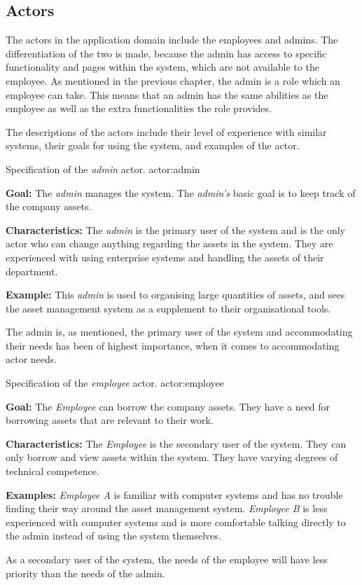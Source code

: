 \subsection{Actors} \label{scc:actors}
The actors in the application domain include the employees and admins. The differentiation of the two is made, because the admin has access to specific functionality and pages within the system, which are not available to the employee. As mentioned in the previous chapter, the admin is a role which an employee can take. This means that an admin has the same abilities as the employee as well as the extra functionalities the role provides.
\par
The descriptions of the actors include their level of experience with similar systems, their goals for using the system, and examples of the actor.

    {Specification of the \textit{admin} actor.}
    {actor:admin}
    {
        \textbf{Goal:} The \textit{admin} manages the system. The \textit{admin's} basic goal is to keep track of the company assets.
        \vskip 0.2cm
        
        \textbf{Characteristics:} The \textit{admin} is the primary user of the system and is the only actor who can change anything regarding the assets in the system. They are experienced with using enterprise systems and handling the assets of their department.
        \vskip 0.2cm
        
        \textbf{Example:} This \textit{admin} is used to organising large quantities of assets, and sees the asset management system as a supplement to their organisational tools.
    }

The admin is, as mentioned, the primary user of the system and accommodating their needs has been of highest importance, when it comes to accommodating actor needs.

    {Specification of the \textit{employee} actor.}
    {actor:employee}
    {
        \textbf{Goal:} The \textit{Employee} can borrow the company assets. They have a need for borrowing assets that are relevant to their work.
        \vskip 0.2cm
        
        \textbf{Characteristics:} The \textit{Employee} is the secondary user of the system. They can only borrow and view assets within the system. They have varying degrees of technical competence.
        \vskip 0.2cm
        
        \textbf{Examples:} \textit{Employee A} is familiar with computer systems and has no trouble finding their way around the asset management system.
        \vskip 0.1cm
        \textit{Employee B} is less experienced with computer systems and is more comfortable talking directly to the admin instead of using the system themselves. 
    }
As a secondary user of the system, the needs of the employee will have less priority than the needs of the admin.
